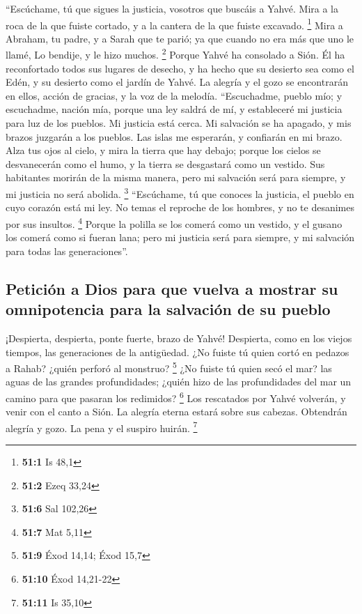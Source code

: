 \begin{paracol}{2}
 ``Escúchame, tú que sigues la justicia, vosotros que
buscáis a Yahvé. Mira a la roca de la que fuiste cortado, y a la cantera
de la que fuiste excavado. \footnote{\textbf{51:1} Is 48,1}
 Mira a Abraham, tu padre, y a Sarah que te parió; ya que
cuando no era más que uno le llamé, Lo bendije, y le hizo muchos.
\footnote{\textbf{51:2} Ezeq 33,24}  Porque Yahvé ha
consolado a Sión. Él ha reconfortado todos sus lugares de desecho, y ha
hecho que su desierto sea como el Edén, y su desierto como el jardín de
Yahvé. La alegría y el gozo se encontrarán en ellos, acción de gracias,
y la voz de la melodía.  ``Escuchadme, pueblo mío; y
escuchadme, nación mía, porque una ley saldrá de mí, y estableceré mi
justicia para luz de los pueblos.  Mi justicia está cerca.
Mi salvación se ha apagado, y mis brazos juzgarán a los pueblos. Las
islas me esperarán, y confiarán en mi brazo.  Alza tus
ojos al cielo, y mira la tierra que hay debajo; porque los cielos se
desvanecerán como el humo, y la tierra se desgastará como un vestido.
Sus habitantes morirán de la misma manera, pero mi salvación será para
siempre, y mi justicia no será abolida. \footnote{\textbf{51:6} Sal
  102,26}  ``Escúchame, tú que conoces la justicia, el
pueblo en cuyo corazón está mi ley. No temas el reproche de los hombres,
y no te desanimes por sus insultos. \footnote{\textbf{51:7} Mat 5,11}
 Porque la polilla se los comerá como un vestido, y el
gusano los comerá como si fueran lana; pero mi justicia será para
siempre, y mi salvación para todas las generaciones''.

\hypertarget{peticiuxf3n-a-dios-para-que-vuelva-a-mostrar-su-omnipotencia-para-la-salvaciuxf3n-de-su-pueblo}{%
\subsection{Petición a Dios para que vuelva a mostrar su omnipotencia
para la salvación de su
pueblo}\label{peticiuxf3n-a-dios-para-que-vuelva-a-mostrar-su-omnipotencia-para-la-salvaciuxf3n-de-su-pueblo}}

 ¡Despierta, despierta, ponte fuerte, brazo de Yahvé!
Despierta, como en los viejos tiempos, las generaciones de la
antigüedad. ¿No fuiste tú quien cortó en pedazos a Rahab? ¿quién perforó
al monstruo? \footnote{\textbf{51:9} Éxod 14,14; Éxod 15,7}
 ¿No fuiste tú quien secó el mar? las aguas de las
grandes profundidades; ¿quién hizo de las profundidades del mar un
camino para que pasaran los redimidos? \footnote{\textbf{51:10} Éxod
  14,21-22}  Los rescatados por Yahvé volverán, y venir
con el canto a Sión. La alegría eterna estará sobre sus cabezas.
Obtendrán alegría y gozo. La pena y el suspiro huirán. \footnote{\textbf{51:11}
  Is 35,10}


\end{paracol}
